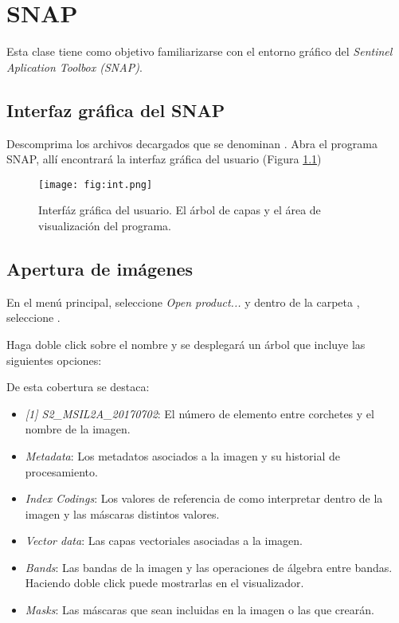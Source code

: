 \chapter{SNAP}

Esta clase tiene como objetivo familiarizarse con el entorno gráfico del \emph{Sentinel Aplication Toolbox (SNAP)}.

\section{Interfaz gráfica del SNAP}

Descomprima los archivos decargados que se denominan . Abra el programa SNAP, allí encontrará la interfaz gráfica del usuario (Figura \ref{fig:int})

\begin{figure}[h!]
    \centering
    \texttt{[image: fig:int.png]}
    \caption{Interfáz gráfica del usuario. El árbol de capas y el área de visualización del programa.}
    \label{fig:int}
\end{figure}

\section{Apertura de imágenes}

En el menú principal, seleccione \emph{Open product...} y dentro de la carpeta , seleccione .

Haga doble click sobre el nombre y se desplegará un árbol que incluye las siguientes opciones:

De esta cobertura se destaca:

\begin{itemize}
    \item \emph{[1] S2\_MSIL2A\_20170702}: El número de elemento entre corchetes y el nombre de la imagen.
    \item \emph{Metadata}: Los metadatos asociados a la imagen y su historial de procesamiento.
    \item \emph{Index Codings}: Los valores de referencia de como interpretar dentro de la imagen y las máscaras distintos valores.
    \item \emph{Vector data}: Las capas vectoriales asociadas a la imagen.
    \item \emph{Bands}: Las bandas de la imagen y las operaciones de álgebra entre bandas. Haciendo doble click puede mostrarlas en el visualizador.
    \item \emph{Masks}: Las máscaras que sean incluidas en la imagen o las que crearán.
\end{itemize}

